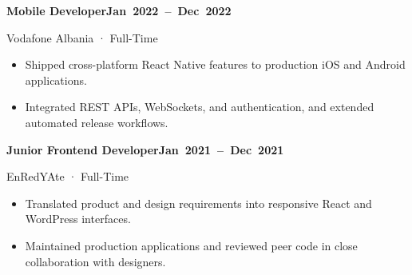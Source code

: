 \documentclass[10pt,a4paper]{article}
\newcommand{\entry}[2]{\Needspace{5\baselineskip}\par\addvspace{5pt}\noindent\textbf{#1}\hfill\mbox{\textbf{#2}}\par}
\newcommand{\job}[3]{\entry{#1}{#2}\vspace{-\parskip}#3\par}
\begin{document}
\job{Mobile Developer}{Jan 2022 – Dec 2022}{Vodafone Albania · Full-Time}
\begin{itemize}
  \item Shipped cross-platform React Native features to production iOS and Android applications.
  \item Integrated REST APIs, WebSockets, and authentication, and extended automated release workflows.
\end{itemize}
\job{Junior Frontend Developer}{Jan 2021 – Dec 2021}{EnRedYAte · Full-Time}
\begin{itemize}
  \item Translated product and design requirements into responsive React and WordPress interfaces.
  \item Maintained production applications and reviewed peer code in close collaboration with designers.
\end{itemize}
\newpage
\fontsize{9.5}{11}\selectfont
\setlength{\emergencystretch}{1em}
\setlength{\parskip}{2pt}
\end{document}
